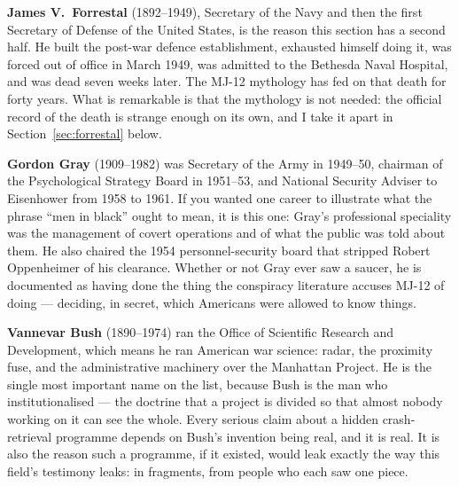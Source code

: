 \textbf{James V.~Forrestal} (1892--1949), Secretary of the Navy and then the first Secretary of
Defense of the United States, is the reason this section has a second half. He built the
post-war defence establishment, exhausted himself doing it, was forced out of office in March
1949, was admitted to the Bethesda Naval Hospital, and was dead seven weeks later. The MJ-12
mythology has fed on that death for forty years. What is remarkable is that the mythology is not
needed: the official record of the death is strange enough on its own, and I take it apart in
Section~\ref{sec:forrestal} below.

\textbf{Gordon Gray} (1909--1982) was Secretary of the Army in 1949--50, chairman of the
Psychological Strategy Board in 1951--53, and National Security Adviser to Eisenhower from 1958 to
1961. If you wanted one career to illustrate what the phrase ``men in black'' ought to mean, it is
this one: Gray's professional speciality was the management of covert operations and of what the
public was told about them. He also chaired the 1954 personnel-security board that stripped Robert
Oppenheimer of his clearance. Whether or not Gray ever saw a saucer, he is documented as having
done the thing the conspiracy literature accuses MJ-12 of doing --- deciding, in secret, which
Americans were allowed to know things.

\textbf{Vannevar Bush} (1890--1974) ran the Office of Scientific Research and Development, which
means he ran American war science: radar, the proximity fuse, and the administrative machinery over
the Manhattan Project. He is the single most important name on the list, because Bush is the man
who institutionalised  --- the doctrine that a project is divided so that
almost nobody working on it can see the whole. Every serious claim about a hidden crash-retrieval
programme depends on Bush's invention being real, and it is real. It is also the reason such a
programme, if it existed, would leak exactly the way this field's testimony leaks: in fragments,
from people who each saw one piece.

